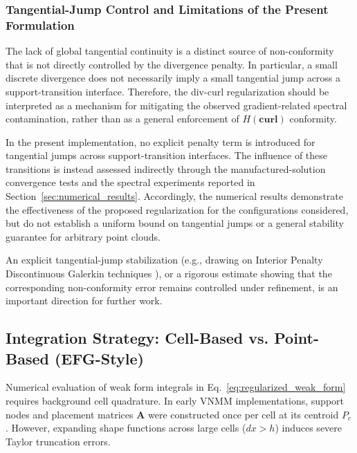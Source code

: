 \documentclass[preprint,12pt]{elsarticle}
\begin{document}
\subsubsection{Tangential-Jump Control and Limitations of the Present Formulation}
\label{subsubsec:tangential_jump_limitations}

The lack of global tangential continuity is a distinct source of non-conformity that is not directly controlled by the divergence penalty. In particular, a small discrete divergence does not necessarily imply a small tangential jump across a support-transition interface. Therefore, the div-curl regularization should be interpreted as a mechanism for mitigating the observed gradient-related spectral contamination, rather than as a general enforcement of $H(\mathbf{curl})$ conformity.

In the present implementation, no explicit penalty term is introduced for tangential jumps across support-transition interfaces. The influence of these transitions is instead assessed indirectly through the manufactured-solution convergence tests and the spectral experiments reported in Section~\ref{sec:numerical_results}. Accordingly, the numerical results demonstrate the effectiveness of the proposed regularization for the configurations considered, but do not establish a uniform bound on tangential jumps or a general stability guarantee for arbitrary point clouds.

An explicit tangential-jump stabilization (e.g., drawing on Interior Penalty Discontinuous Galerkin techniques \cite{houston2004mixed, hesthaven2004high}), or a rigorous estimate showing that the corresponding non-conformity error remains controlled under refinement, is an important direction for further work.



\subsection{Integration Strategy: Cell-Based vs. Point-Based (EFG-Style)}
\label{subsec:integration_strategy}

Numerical evaluation of weak form integrals in Eq.~\eqref{eq:regularized_weak_form} requires background cell quadrature. In early VNMM implementations, support nodes and placement matrices $\mathbf{A}$ were constructed once per cell at its centroid $P_c$ \cite{ortiz2021nodal, ortiz2023tese}. However, expanding shape functions across large cells ($dx > h$) induces severe Taylor truncation errors.
\end{document}
